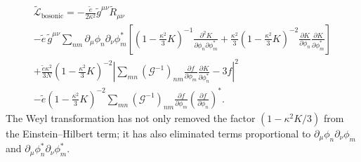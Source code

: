\begin{multline}
  \widetilde{\mathcal L}_{\mathrm{bosonic}}
  =-\frac{\widetilde e}{2\kappa^2}
    \widetilde g^{\mu\nu}\widetilde R_{\mu\nu}\\
  -\widetilde e\,\widetilde g^{\mu\nu}
    \sum_{nm}\partial_\mu\phi_n\partial_\nu\phi_m^*
    \left[
      \left(1-\frac{\kappa^2}{3}K\right)^{-1}
      \frac{\partial^2K}{\partial\phi_n\partial\phi_m^*}
      +\frac{\kappa^2}{3}
      \left(1-\frac{\kappa^2}{3}K\right)^{-2}
      \frac{\partial K}{\partial\phi_n}
      \frac{\partial K}{\partial\phi_m^*}
    \right]\\
  +\frac{\widetilde e\kappa^2}{3N}
    \left(1-\frac{\kappa^2}{3}K\right)^{-2}
    \left|
      \sum_{mn}(\mathcal G^{-1})_{nm}
      \frac{\partial f}{\partial\phi_m}
      \frac{\partial K}{\partial\phi_n^*}
      -3f
    \right|^2\\
  -\widetilde e
    \left(1-\frac{\kappa^2}{3}K\right)^{-2}
    \sum_{mn}(\mathcal G^{-1})_{nm}
    \frac{\partial f}{\partial\phi_m}
    \left(\frac{\partial f}{\partial\phi_n}\right)^*.
  \tag{31.6.64}\label{eq:31.6.64}
\end{multline}
The Weyl transformation has not only removed the factor
\((1-\kappa^2K/3)\) from the Einstein--Hilbert term; it has also
eliminated terms proportional to
\(\partial_\mu\phi_n\partial_\nu\phi_m\) and
\(\partial_\mu\phi_n^*\partial_\nu\phi_m^*\).

